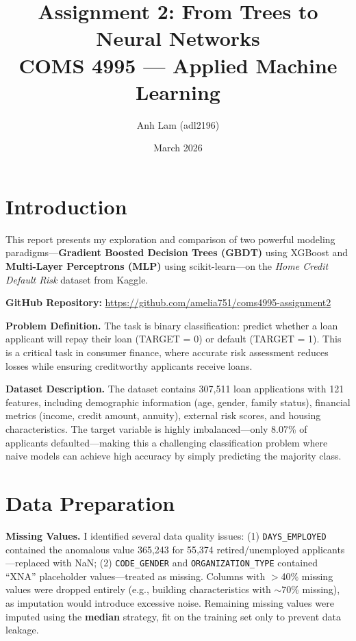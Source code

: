 \documentclass[11pt, letterpaper]{article}
\title{\textbf{Assignment 2: From Trees to Neural Networks}\\[0.3em]
\large COMS 4995 --- Applied Machine Learning}
\author{Anh Lam (adl2196)}
\date{March 2026}
\begin{document}
\maketitle

\section*{Introduction}

This report presents my exploration and comparison of two powerful modeling paradigms---\textbf{Gradient Boosted Decision Trees (GBDT)} using XGBoost and \textbf{Multi-Layer Perceptrons (MLP)} using scikit-learn---on the \textit{Home Credit Default Risk} dataset from Kaggle.

\textbf{GitHub Repository:} \url{https://github.com/amelia751/coms4995-assignment2}

\textbf{Problem Definition.} The task is binary classification: predict whether a loan applicant will repay their loan (TARGET = 0) or default (TARGET = 1). This is a critical task in consumer finance, where accurate risk assessment reduces losses while ensuring creditworthy applicants receive loans.

\textbf{Dataset Description.} The dataset contains 307,511 loan applications with 121 features, including demographic information (age, gender, family status), financial metrics (income, credit amount, annuity), external risk scores, and housing characteristics. The target variable is highly imbalanced---only 8.07\% of applicants defaulted---making this a challenging classification problem where naive models can achieve high accuracy by simply predicting the majority class.

\section{Data Preparation}

\textbf{Missing Values.} I identified several data quality issues: (1) \texttt{DAYS\_EMPLOYED} contained the anomalous value 365,243 for 55,374 retired/unemployed applicants---replaced with NaN; (2) \texttt{CODE\_GENDER} and \texttt{ORGANIZATION\_TYPE} contained ``XNA'' placeholder values---treated as missing. Columns with $>$40\% missing values were dropped entirely (e.g., building characteristics with $\sim$70\% missing), as imputation would introduce excessive noise. Remaining missing values were imputed using the \textbf{median} strategy, fit on the training set only to prevent data leakage.
\end{document}
